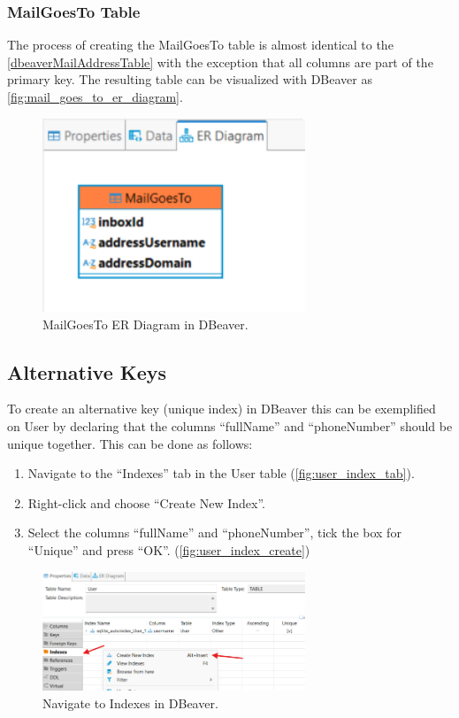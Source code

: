 \documentclass[a4paper,11pt,oneside]{article}
\begin{document}
\begin{sloppypar}
\subsubsection{MailGoesTo Table}
\label{dbeaverMailGoesToTable}
The process of creating the MailGoesTo table is almost identical to the \autoref{dbeaverMailAddressTable} with the exception that all columns are part of the primary key. The resulting table can be visualized with DBeaver as \autoref{fig:mail_goes_to_er_diagram}.

\begin{figure}[!htb]
  \centering
  \includegraphics[width=0.7\textwidth]{dbeaver/mail_goes_to_er_diagram.png}
  \caption{MailGoesTo ER Diagram in DBeaver.}
  \label{fig:mail_goes_to_er_diagram}
\end{figure}

\subsection{Alternative Keys}
\label{dbeaverAlternativeKeys}
To create an alternative key (unique index) in DBeaver this can be exemplified on User by declaring that the columns ``fullName'' and ``phoneNumber'' should be unique together. This can be done as follows:

\begin{enumerate}
  \item Navigate to the ``Indexes'' tab in the User table (\autoref{fig:user_index_tab}).
  \item Right-click and choose ``Create New Index''.
  \item Select the columns ``fullName'' and ``phoneNumber'', tick the box for ``Unique'' and press ``OK''. (\autoref{fig:user_index_create})
\end{enumerate}

\begin{figure}[!htb]
  \centering
  \includegraphics[width=0.7\textwidth]{dbeaver/user_index_tab.png}
  \caption{Navigate to Indexes in DBeaver.}
  \label{fig:user_index_tab}
\end{figure}


\end{sloppypar}
\end{document}

